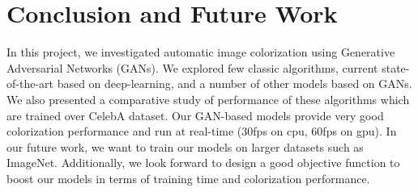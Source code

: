 \documentclass[10pt]{article}
\begin{document}
\section{Conclusion and Future Work}
In this project, we investigated automatic image colorization using Generative Adversarial Networks (GANs). 
We explored few classic algorithms, current state-of-the-art based on deep-learning, and a number of other models based on GANs. 
We also presented a comparative study of performance of these algorithms which are trained over CelebA dataset. 
Our GAN-based models provide very good colorization performance and run at real-time ($30$fps on cpu, $60$fps on gpu). 
In our future work, we want to train our models on larger datasets such as ImageNet. 
Additionally, we look forward to design a good objective function to boost our models in terms of training time and colorization performance. 

\vspace{1mm}

\footnotesize

\end{document}
